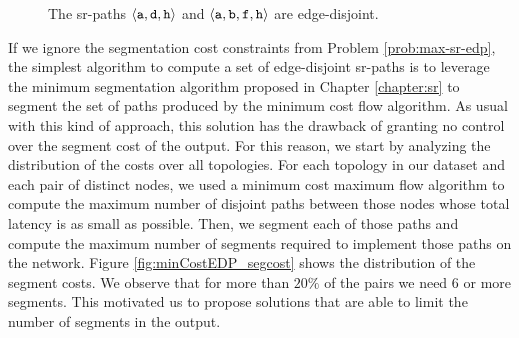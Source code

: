 \begin{figure}
\begin{center}
\end{center}
\caption{The sr-paths $\langle \texttt{a}, \texttt{d}, \texttt{h} \rangle$ and $\langle \texttt{a}, \texttt{b}, \texttt{f}, \texttt{h} \rangle$ are edge-disjoint.}
\label{fig:disjoint}
\end{figure}

If we ignore the segmentation cost constraints from Problem \ref{prob:max-sr-edp}, the
simplest algorithm to compute a set of edge-disjoint sr-paths is to leverage the minimum segmentation algorithm proposed
in Chapter \ref{chapter:sr} to segment the set of paths produced by the minimum cost flow algorithm. As usual with this
kind of approach, this solution has the drawback of granting no control over the segment cost of the output. For this reason,
we start by analyzing the distribution of the costs over all topologies.
For each topology in our dataset and each pair of distinct nodes, we used a minimum cost maximum flow algorithm to
compute the maximum number of disjoint paths between those nodes whose total latency is as small as possible. Then, we segment each
of those paths and compute the maximum number of segments required to implement those paths on the network. Figure \ref{fig:minCostEDP_segcost}
shows the distribution of the segment costs. We observe that for more than $20\%$ of the pairs we need $6$ or more segments. This motivated
us to propose solutions that are able to limit the number of segments in the output.

